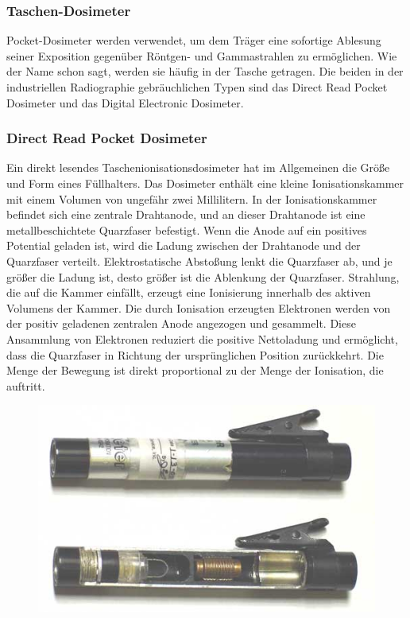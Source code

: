 {\subsubsection{Taschen-Dosimeter}
Pocket-Dosimeter werden verwendet, um dem Träger eine sofortige Ablesung seiner Exposition gegenüber Röntgen- und Gammastrahlen zu ermöglichen. Wie der Name schon sagt, werden sie häufig in der Tasche getragen. Die beiden in der industriellen Radiographie gebräuchlichen Typen sind das Direct Read Pocket Dosimeter und das Digital Electronic Dosimeter.
\subsubsection{Direct Read Pocket Dosimeter}
Ein direkt lesendes Taschenionisationsdosimeter hat im Allgemeinen die Größe und Form eines Füllhalters. Das Dosimeter enthält eine kleine Ionisationskammer mit einem Volumen von ungefähr zwei Millilitern. In der Ionisationskammer befindet sich eine zentrale Drahtanode, und an dieser Drahtanode ist eine metallbeschichtete Quarzfaser befestigt. Wenn die Anode auf ein positives Potential geladen ist, wird die Ladung zwischen der Drahtanode und der Quarzfaser verteilt. Elektrostatische Abstoßung lenkt die Quarzfaser ab, und je größer die Ladung ist, desto größer ist die Ablenkung der Quarzfaser. Strahlung, die auf die Kammer einfällt, erzeugt eine Ionisierung innerhalb des aktiven Volumens der Kammer. Die durch Ionisation erzeugten Elektronen werden von der positiv geladenen zentralen Anode angezogen und gesammelt. Diese Ansammlung von Elektronen reduziert die positive Nettoladung und ermöglicht, dass die Quarzfaser in Richtung der ursprünglichen Position zurückkehrt. Die Menge der Bewegung ist direkt proportional zu der Menge der Ionisation, die auftritt.\\
\begin{figure}[htb]
  \includegraphics[scale=0.3]{img/dosimeter&cutaway.jpg}\\

\end{figure}}
